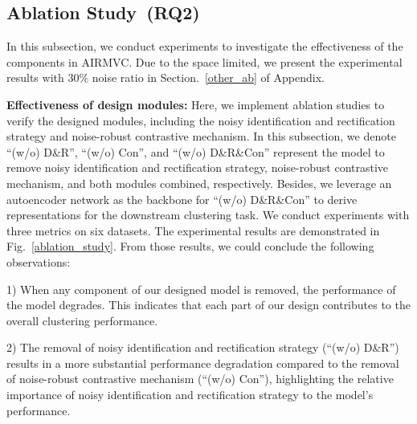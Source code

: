 \documentclass{article}
\theoremstyle{plain}
\theoremstyle{definition}
\theoremstyle{remark}
\begin{document}
\subsection{Ablation Study~\textbf{(RQ2)}}\label{ab}
In this subsection, we conduct experiments to investigate the effectiveness of the components in AIRMVC. Due to the space limited, we present the experimental results with 30\% noise ratio in Section.~\ref{other_ab} of Appendix.





\textbf{Effectiveness of design modules:} Here, we implement ablation studies to verify the designed modules, including the noisy identification and rectification strategy and noise-robust contrastive mechanism. In this subsection, we denote ``(w/o) D\&R'', ``(w/o) Con'', and ``(w/o) D\&R\&Con'' represent the model to remove noisy identification and rectification strategy, noise-robust contrastive mechanism, and both modules combined, respectively. Besides, we leverage an autoencoder network as the backbone for ``(w/o) D\&R\&Con'' to derive representations for the downstream clustering task. We conduct experiments with three metrics on six datasets. The experimental results are demonstrated in Fig.~\ref{ablation_study}. From those results, we could conclude the following observations: 

1) When any component of our designed model is removed, the performance of the model degrades. This indicates that each part of our design contributes to the overall clustering performance. 

2) The removal of noisy identification and rectification strategy (``(w/o) D\&R'') results in a more substantial performance degradation compared to the removal of noise-robust contrastive mechanism (``(w/o) Con''), highlighting the relative importance of noisy identification and rectification strategy to the model’s performance. 



\end{document}
